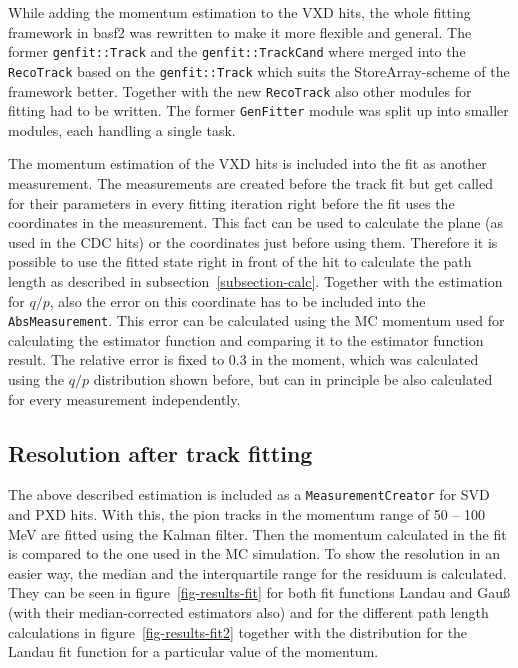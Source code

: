 While adding the momentum estimation to the VXD hits, the whole fitting framework in basf2 was rewritten to make it more flexible and general. The former \texttt{genfit::Track} and the \texttt{genfit::TrackCand} where merged into the \texttt{RecoTrack} based on the \texttt{genfit::Track} which suits the StoreArray-scheme of the framework better. Together with the new \texttt{RecoTrack} also other modules for fitting had to be written. The former \texttt{GenFitter} module was split up into smaller modules, each handling a single task. 

The momentum estimation of the VXD hits is included into the fit as another measurement. The measurements are created before the track fit but get called for their parameters in every fitting iteration right before the fit uses the coordinates in the measurement. This fact can be used to calculate the plane (as used in the CDC hits) or the coordinates just before using them. Therefore it is possible to use the fitted state right in front of the hit to calculate the path length as described in subsection~\ref{subsection-calc}. Together with the estimation for $q/p$, also the error on this coordinate has to be included into the \texttt{AbsMeasurement}. This error can be calculated using the MC momentum used for calculating the estimator function and comparing it to the estimator function result. The relative error is fixed to 0.3 in the moment, which was calculated using the $q/p$ distribution shown before, but can in principle be also calculated for every measurement independently.

\subsection{Resolution after track fitting}

The above described estimation is included as a \texttt{MeasurementCreator} for SVD and PXD hits. With this, the pion tracks in the momentum range of 50 -- 100 MeV are fitted using the Kalman filter. Then the momentum calculated in the fit is compared to the one used in the MC simulation. To show the resolution in an easier way, the median and the interquartile range for the residuum is calculated. They can be seen in figure~\ref{fig-results-fit} for both fit functions Landau and Gauß (with their median-corrected estimators also) and for the different path length calculations in figure~\ref{fig-results-fit2} together with the distribution for the Landau fit function for a particular value of the momentum.

